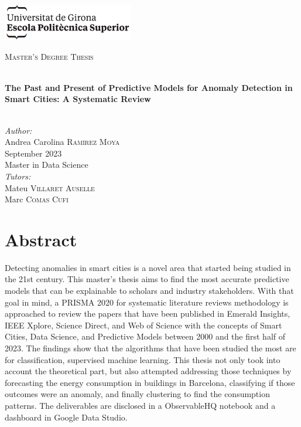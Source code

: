 \documentclass[a4paper,12pt,twoside]{ThesisStyle}
\begin{document}
\newpage
\hypersetup{pageanchor=false}
\begin{titlepage}

\includegraphics[scale=0.9]{imatges/logo_eps.png} \\[1cm]
\begin{center}
\textsc{\Large Master's Degree Thesis} \\[1cm]

\begin{spacing}{2}
\HRule \\
\textbf{\Huge The Past and Present of Predictive Models for Anomaly Detection in Smart Cities: A Systematic Review} \\
\HRule \\[0.5cm]
\end{spacing}

{
\large
\emph{Author:} \\
Andrea Carolina \textsc{Ramirez Moya} \\[1cm]
September 2023 \\[1cm]
Master in Data Science \\[1cm]
\emph{Tutors:} \\
Mateu \textsc{Villaret Auselle} \\
Marc \textsc{Comas Cufi} \\
}

\end{center}
\end{titlepage}
\hypersetup{pageanchor=true}

\titlepage




\chapter*{Abstract}

Detecting anomalies in smart cities is a novel area that started being studied in the 21st century. This master's thesis aims to find the most accurate predictive models that can be explainable to scholars and industry stakeholders. With that goal in mind, a PRISMA 2020 for systematic literature reviews methodology is approached to review the papers that have been published in Emerald Insights, IEEE Xplore, Science Direct, and Web of Science with the concepts of Smart Cities, Data Science, and Predictive Models between 2000 and the first half of 2023. The findings show that the algorithms that have been studied the most are for classification, supervised machine learning. This thesis not only took into account the theoretical part, but also attempted addressing those techniques by forecasting the energy consumption in buildings in Barcelona, classifying if those outcomes were an anomaly, and finally clustering to find the consumption patterns. The deliverables are disclosed in a ObservableHQ notebook and a dashboard in Google Data Studio. 
\end{document}

